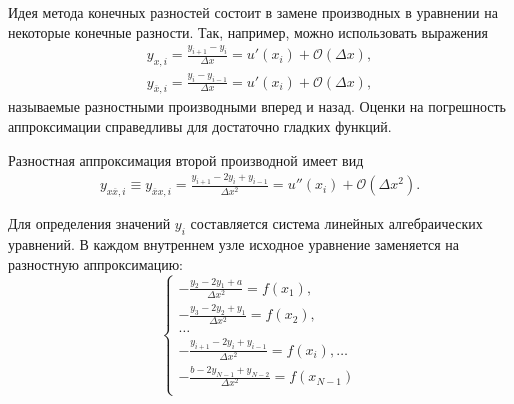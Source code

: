 \documentclass[a4paper, 11pt]{article}
\begin{document}
Идея метода конечных разностей состоит в замене производных в уравнении на некоторые конечные разности. Так, например, можно использовать выражения
\begin{equation}\label{eq:differences_1}
	\begin{split}
		y_{x,i} = \frac{y_{i+1} - y_i}{\Delta x} = u'(x_i) + \mathcal{O}(\Delta x),\\
		y_{\overline{x},i} = \frac{y_i - y_{i-1}}{\Delta x} = u'(x_i) + \mathcal{O}(\Delta x),
	\end{split}
\end{equation}
называемые разностными производными вперед и назад. Оценки на погрешность аппроксимации справедливы для достаточно гладких функций.

Разностная аппроксимация второй производной имеет вид
\begin{equation}\label{eq:differences_2}
	\begin{split}
		y_{x\overline{x},i} \equiv y_{\overline{x}x,i} = \frac{y_{i+1} - 2y_i + y_{i-1}}{\Delta x^2} = u''(x_i) + \mathcal{O}(\Delta x^2).
	\end{split}
\end{equation}

Для определения значений $y_i$ составляется система линейных алгебраических уравнений. В каждом внутреннем узле исходное уравнение заменяется на разностную аппроксимацию:
\begin{equation}
	\begin{cases}
		-\frac{y_{2} - 2y_1 + a}{\Delta x^2} = f(x_1),\\
		-\frac{y_{3} - 2y_2 + y_1}{\Delta x^2} = f(x_2),\\
		\dots\\
		-\frac{y_{i+1} - 2y_i + y_{i-1}}{\Delta x^2} = f(x_i),
		\dots\\
		-\frac{b - 2y_{N-1} + y_{N-2}}{\Delta x^2} = f(x_{N-1})\\
	\end{cases}
\end{equation}
\end{document}
